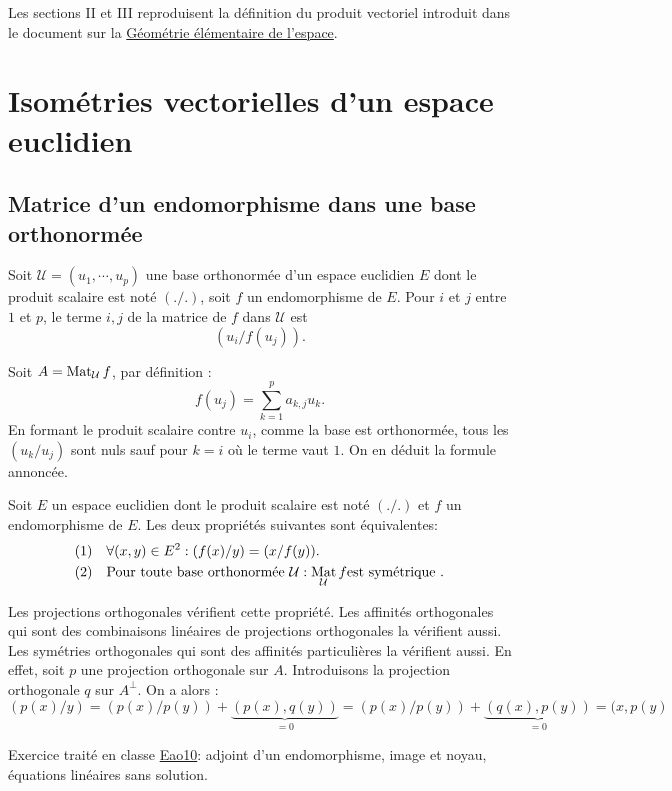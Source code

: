 

Les sections II et III reproduisent la définition du produit vectoriel introduit dans le document sur la \href{\baseurl C2006.pdf}{Géométrie élémentaire de l'espace}.
\section{Isométries vectorielles d'un espace euclidien}
\subsection{Matrice d'un endomorphisme dans une base orthonormée}
\begin{prop}
 Soit $\mathcal U=(u_1,\cdots,u_p)$ une base orthonormée d'un espace euclidien $E$ dont le produit scalaire est noté $(./.)$, soit $f$ un endomorphisme de $E$. Pour $i$ et $j$ entre $1$ et $p$, le terme $i,j$ de la matrice de $f$ dans $\mathcal U$ est 
\begin{displaymath}
 (u_i/f(u_j)).
\end{displaymath}
\end{prop}
\begin{demo}
 Soit $A=\mathop{\mathrm{Mat}}_{\mathcal U}f$, par définition :
\begin{displaymath}
 f(u_j) = \sum_{k=1}^p a_{k,j}u_k.
\end{displaymath}
En formant le produit scalaire contre $u_i$, comme la base est orthonormée, tous les $(u_k/u_j)$ sont nuls sauf pour $k=i$ où le terme vaut $1$. On en déduit la formule annoncée.
\end{demo}
\newpage
\begin{prop}
 Soit $E$ un espace euclidien dont le produit scalaire est noté $(./.)$ et $f$ un endomorphisme de $E$. Les deux propriétés suivantes sont équivalentes:
\begin{align*}
 &(1)& &\forall (x,y)\in E^2 : (f(x)/y) = (x/f(y)). \\
 &(2)& &\text{Pour toute base orthonormée }\mathcal U : \mathop{\mathrm{Mat}}_{\mathcal U}f \text{est symétrique .}
\end{align*}
\end{prop}
\begin{exple}
 Les projections orthogonales vérifient cette propriété. Les affinités orthogonales qui sont des combinaisons linéaires de projections orthogonales la vérifient aussi. Les symétries orthogonales qui sont des affinités particulières la vérifient aussi.\newline
En effet, soit $p$ une projection orthogonale sur $A$. Introduisons la projection orthogonale $q$ sur $A^\bot$. On a alors :
\begin{displaymath}
 (p(x)/y)=(p(x)/p(y))+ \underset{=0}{\underbrace{(p(x),q(y))}}
= (p(x)/p(y))+ \underset{=0}{\underbrace{(q(x),p(y))}}
= (x,p(y)
\end{displaymath}
\end{exple}
Exercice traité en classe \hyperref{\urlexo _fex_ao.pdf}{exo}{Eao10}{Eao10}: adjoint d'un endomorphisme, image et noyau, équations linéaires sans solution.
\clearpage
